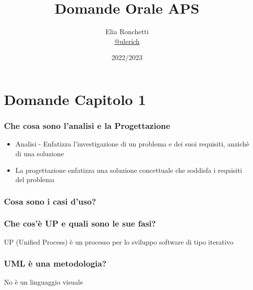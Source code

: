 \documentclass[12pt, a4paper, openany]{book}
\begin{document}
\title{Domande Orale APS}

\author{
    Elia Ronchetti\\
	\small{\href{https://t.me/ulerich}{@ulerich}}
}

\date{2022/2023}

\maketitle

\tableofcontents

\chapter{Domande Capitolo 1}
\subsection*{Che cosa sono l'analisi e la Progettazione}
\begin{itemize}
    \item Analisi - Enfatizza l'investigazione di un problema e dei suoi requisiti,
    anzichè di una soluzione
    \item La progettazione enfatizza una soluzione concettuale che soddisfa i
    requisiti del problema
\end{itemize}

\subsection*{Cosa sono i casi d'uso?}
\subsection*{Che cos'è UP e quali sono le sue fasi?}
UP (Unified Process) è un processo per lo sviluppo software di tipo iterativo

\subsection*{UML è una metodologia?}
No è un linguaggio visuale
\end{document}
